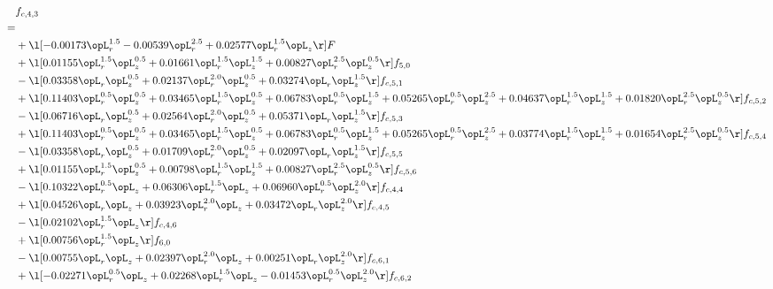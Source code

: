 \begin{alignat}{2} 
\label{eq:f_43_2} 
& f_{c,4,3} \nonumber \\ 
 = \\ 
& + \l[  -0.00173 \opL_r^{1.5}   -0.00539 \opL_r^{2.5} +  0.02577 \opL_r^{1.5} \opL_z  \r] F \nonumber \\ 
& + \l[  0.01155 \opL_r^{1.5} \opL_z^{0.5} +  0.01661 \opL_r^{1.5} \opL_z^{1.5} +  0.00827 \opL_r^{2.5} \opL_z^{0.5}  \r] f_{5,0} \nonumber \\ 
& - \l[  0.03358 \opL_r \opL_z^{0.5} +  0.02137 \opL_r^{2.0} \opL_z^{0.5} +  0.03274 \opL_r \opL_z^{1.5}  \r] f_{c,5,1} \nonumber \\ 
& + \l[  0.11403 \opL_r^{0.5} \opL_z^{0.5} +  0.03465 \opL_r^{1.5} \opL_z^{0.5} +  0.06783 \opL_r^{0.5} \opL_z^{1.5} +  0.05265 \opL_r^{0.5} \opL_z^{2.5} +  0.04637 \opL_r^{1.5} \opL_z^{1.5} +  0.01820 \opL_r^{2.5} \opL_z^{0.5}  \r] f_{c,5,2} \nonumber \\ 
& - \l[  0.06716 \opL_r \opL_z^{0.5} +  0.02564 \opL_r^{2.0} \opL_z^{0.5} +  0.05371 \opL_r \opL_z^{1.5}  \r] f_{c,5,3} \nonumber \\ 
& + \l[  0.11403 \opL_r^{0.5} \opL_z^{0.5} +  0.03465 \opL_r^{1.5} \opL_z^{0.5} +  0.06783 \opL_r^{0.5} \opL_z^{1.5} +  0.05265 \opL_r^{0.5} \opL_z^{2.5} +  0.03774 \opL_r^{1.5} \opL_z^{1.5} +  0.01654 \opL_r^{2.5} \opL_z^{0.5}  \r] f_{c,5,4} \nonumber \\ 
& - \l[  0.03358 \opL_r \opL_z^{0.5} +  0.01709 \opL_r^{2.0} \opL_z^{0.5} +  0.02097 \opL_r \opL_z^{1.5}  \r] f_{c,5,5} \nonumber \\ 
& + \l[  0.01155 \opL_r^{1.5} \opL_z^{0.5} +  0.00798 \opL_r^{1.5} \opL_z^{1.5} +  0.00827 \opL_r^{2.5} \opL_z^{0.5}  \r] f_{c,5,6} \nonumber \\ 
& - \l[  0.10322 \opL_r^{0.5} \opL_z +  0.06306 \opL_r^{1.5} \opL_z +  0.06960 \opL_r^{0.5} \opL_z^{2.0}  \r] f_{c,4,4} \nonumber \\ 
& + \l[  0.04526 \opL_r \opL_z +  0.03923 \opL_r^{2.0} \opL_z +  0.03472 \opL_r \opL_z^{2.0}  \r] f_{c,4,5} \nonumber \\ 
& - \l[  0.02102 \opL_r^{1.5} \opL_z  \r] f_{c,4,6} \nonumber \\ 
& + \l[  0.00756 \opL_r^{1.5} \opL_z  \r] f_{6,0} \nonumber \\ 
& - \l[  0.00755 \opL_r \opL_z +  0.02397 \opL_r^{2.0} \opL_z +  0.00251 \opL_r \opL_z^{2.0}  \r] f_{c,6,1} \nonumber \\ 
& + \l[  -0.02271 \opL_r^{0.5} \opL_z +  0.02268 \opL_r^{1.5} \opL_z   -0.01453 \opL_r^{0.5} \opL_z^{2.0}  \r] f_{c,6,2} \nonumber \\ 

\end{alignat}
